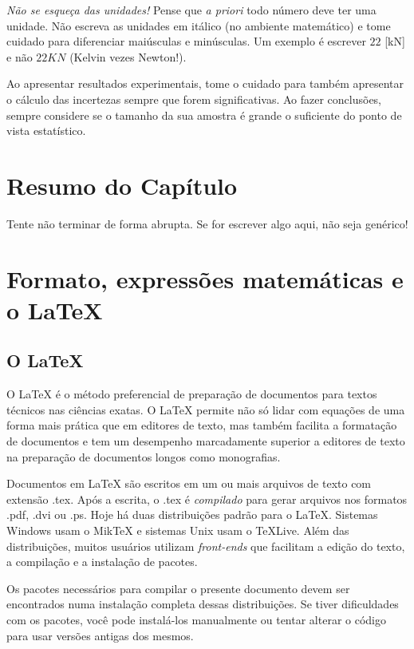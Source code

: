 \emph{Não se esqueça das unidades!} Pense que \emph{a priori} todo número deve ter uma unidade. Não escreva as unidades em itálico (no ambiente matemático) e tome cuidado para diferenciar maiúsculas e minúsculas. Um exemplo é escrever $22$ [kN] e não $22 KN$ (Kelvin vezes Newton!).

Ao apresentar resultados experimentais, tome o cuidado para também apresentar o cálculo das incertezas sempre que forem significativas. Ao fazer conclusões, sempre considere se o tamanho da sua amostra é grande o suficiente do ponto de vista estatístico.

\section{Resumo do Capítulo}
\label{sec:resumoo4}
Tente não terminar de forma abrupta. Se for escrever algo aqui, não seja genérico!

\section{Formato, expressões matemáticas e o \LaTeX}

\subsection{O \LaTeX}

O {\LaTeX}  é o método preferencial de preparação de documentos para textos técnicos nas ciências exatas. O {\LaTeX} permite não só lidar com equações de uma forma mais prática que em editores de texto, mas também facilita a formatação de documentos e tem um desempenho marcadamente superior a editores de texto na preparação de documentos longos como monografias. 

Documentos em {\LaTeX} são escritos em um ou mais arquivos de texto com extensão .tex. Após a escrita, o .tex é \emph{compilado} para gerar arquivos nos formatos .pdf, .dvi ou .ps. Hoje há duas distribuições padrão para o \LaTeX. Sistemas Windows usam o {Mik\TeX} e sistemas Unix usam o \TeX Live. Além das distribuições, muitos usuários utilizam \emph{front-ends} que facilitam a edição do texto, a compilação e a instalação de pacotes. 

Os pacotes necessários para compilar o presente documento devem ser encontrados numa instalação completa dessas distribuições. Se tiver dificuldades com os pacotes, você pode instalá-los manualmente ou tentar alterar o código para usar versões antigas dos mesmos.

